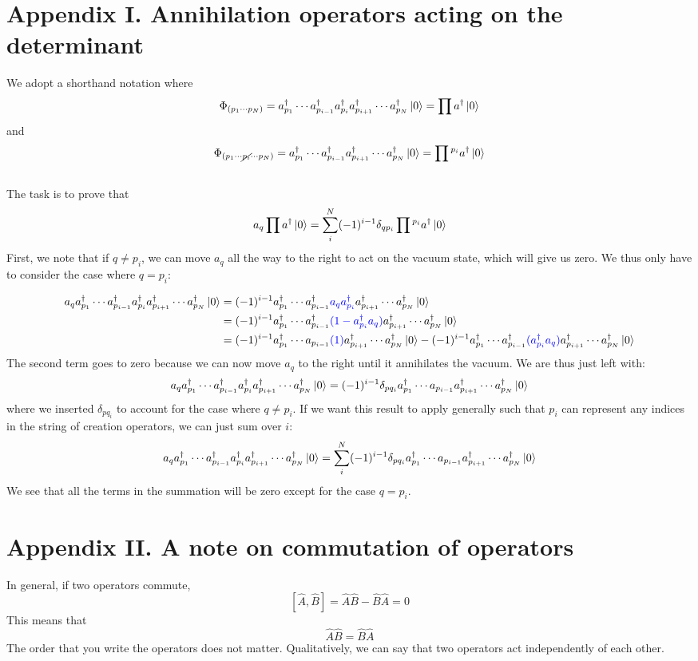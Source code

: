 \documentclass{article}
\newcommand{\dg}{\ensuremath{^\dagger} }
\newcommand{\cd}{\ensuremath{\cdots} }
\begin{document}
\section*{Appendix I. Annihilation operators acting on the determinant} 

We adopt a shorthand notation where 
\[\Phi_{(p_1\cd p_N)}  = a_{p_1}\dg \cd a_{p_{i -1}}\dg a_{p_i}\dg a_{p_{i +1}}\dg \cd a_{p_N}\dg \ket{0} = \prod a\dg \ket{0}\]
and 
\[ \Phi_{(p_1\cd\cancel{p_i}\cd p_N)} = a_{p_1}\dg \cd a_{p_{i -1}}\dg a_{p_{i +1}}\dg \cd a_{p_N}\dg \ket{0} =  \prod{}^{p_i} a\dg \ket{0} \]
\\
The task is to prove that 
\[a_q \prod a\dg \ket{0} =  \sum_i^N (-1)^{i-1} \delta_{qp_i} \prod{}^{p_i} a\dg \ket{0} \]
First, we note that if $ q \neq p_i $, we can move $a_q$ all the way to the right to act on the vacuum state, which will give us zero.
We thus only have to consider the case where  $q = p_i$: 

\begin{align*}
a_q a_{p_1}\dg \cd a_{p_{i -1}}\dg a_{p_i}\dg a_{p_{i +1}}\dg \cd a_{p_N}\dg \ket{0} &= (-1)^{i-1} a_{p_1}\dg \cd a_{p_{i -1}}\dg {\color{blue} a_q a_{p_i}\dg} a_{p_{i +1}}\dg \cd a_{p_N}\dg \ket{0}  \\
&=  (-1)^{i-1} a_{p_1}\dg \cd a_{p_{i -1}}\dg {\color{blue} (1 - a_{p_i}\dg a_q) } a_{p_{i +1}}\dg \cd a_{p_N}\dg \ket{0}  \\
&=  (-1)^{i-1} a_{p_1}\dg \cd a_{p_{i -1}} {\color{blue} (1) }  a_{p_{i +1}}\dg \cd a_{p_N}\dg \ket{0}  - (-1)^{i-1}a_{p_1}\dg \cd a_{p_{i -1}}\dg {\color{blue} (a_{p_i}\dg a_q) } a_{p_{i +1}}\dg \cd a_{p_N}\dg \ket{0} 
\end{align*}
The second term goes to zero because we can now move $a_q$ to the right until it annihilates the vacuum.
We are thus just left with: 
\[a_q a_{p_1}\dg \cd a_{p_{i -1}}\dg a_{p_i}\dg a_{p_{i +1}}\dg \cd a_{p_N}\dg \ket{0}  = (-1)^{i-1}  \delta_{pq_i} a_{p_1}\dg \cd a_{p_{i -1}} a_{p_{i +1}}\dg \cd a_{p_N}\dg \ket{0} \]
where we inserted $ \delta_{pq_i}$ to account for the case where $q \neq p_i$. 
If we want this result to apply generally such that $p_i$ can represent any indices in the string of creation operators, we can just sum over $i$: 
\[a_q a_{p_1}\dg \cd a_{p_{i -1}}\dg a_{p_i}\dg a_{p_{i +1}}\dg \cd a_{p_N}\dg \ket{0}  = \sum_i^{N} (-1)^{i-1}  \delta_{pq_i} a_{p_1}\dg \cd a_{p_{i -1}} a_{p_{i +1}}\dg \cd a_{p_N}\dg \ket{0} \]
We see that all the terms in the summation will be zero except for the case $q = p_i$. 

\section*{Appendix II. A note on commutation of operators}

In general, if two operators commute, 
\[ [\hat{A}, \hat{B}] = \hat{A}\hat{B} -\hat{B}\hat{A} = 0 \]
This means that
\[\hat{A}\hat{B} = \hat{B}\hat{A} \]
The order that you write the operators does not matter.
Qualitatively, we can say that two operators act independently of each other. 
\end{document}
